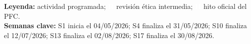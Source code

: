 \documentclass[10pt,a4paper]{article}
\begin{document}
\begin{landscape}
\vspace{0.25cm}
{\footnotesize
\textbf{Leyenda:} \colorbox{RTForest!88}{\phantom{XX}} actividad programada; \colorbox{RTGreen!85}{\textcolor{white}{\textbf{R}}} revisión ética intermedia; \colorbox{RTTerracotta}{\textcolor{white}{\textbf{H}}} hito oficial del PFC.\\
\textbf{Semanas clave:} S1 inicia el 04/05/2026; S4 finaliza el 31/05/2026; S10 finaliza el 12/07/2026; S13 finaliza el 02/08/2026; S17 finaliza el 30/08/2026.
}
\end{landscape}
\end{document}
